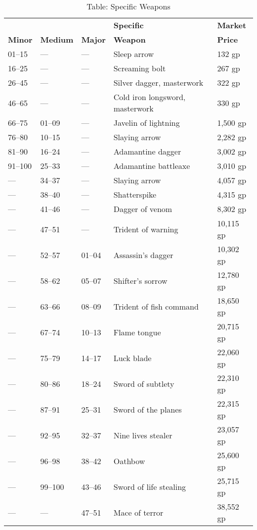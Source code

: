 \begin{table}[]
\sffamily
\caption{Table: Specific Weapons}
\setlength{\tabcolsep}{1pt}
\begin{tabularx}{\linewidth}{lllXl}
               &                 &                & \textbf{Specific} & \textbf{Market} \\
\textbf{Minor} & \textbf{Medium} & \textbf{Major} & \textbf{Weapon} & \textbf{Price}\\
01--15 & --- & --- & Sleep arrow & 132 gp\\
16--25 & --- & --- & Screaming bolt & 267 gp\\
26--45 & --- & --- & Silver dagger, masterwork & 322 gp\\
46--65 & --- & --- & Cold iron longsword, masterwork & 330 gp\\
66--75 & 01--09 & --- & Javelin of lightning & 1,500 gp\\
76--80 & 10--15 & --- & Slaying arrow & 2,282 gp\\
81--90 & 16--24 & --- & Adamantine dagger & 3,002 gp\\
91--100 & 25--33 & --- & Adamantine battleaxe & 3,010 gp\\
--- & 34--37 & --- & Slaying arrow & 4,057 gp\\
--- & 38--40 & --- & Shatterspike & 4,315 gp\\
--- & 41--46 & --- & Dagger of venom & 8,302 gp\\
--- & 47--51 & --- & Trident of warning & 10,115 gp\\
--- & 52--57 & 01--04 & Assassin's dagger & 10,302 gp\\
--- & 58--62 & 05--07 & Shifter's sorrow & 12,780 gp\\
--- & 63--66 & 08--09 & Trident of fish command & 18,650 gp\\
--- & 67--74 & 10--13 & Flame tongue & 20,715 gp\\
--- & 75--79 & 14--17 & Luck blade & 22,060 gp\\
--- & 80--86 & 18--24 & Sword of subtlety & 22,310 gp\\
--- & 87--91 & 25--31 & Sword of the planes & 22,315 gp\\
--- & 92--95 & 32--37 & Nine lives stealer & 23,057 gp\\
--- & 96--98 & 38--42 & Oathbow & 25,600 gp\\
--- & 99--100 & 43--46 & Sword of life stealing & 25,715 gp\\
--- & --- & 47--51 & Mace of terror & 38,552 gp\\

\end{tabularx}
\end{table}
